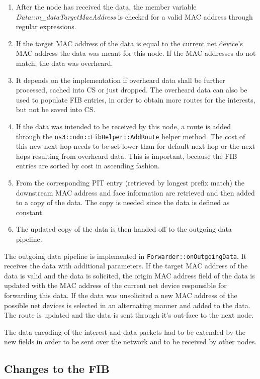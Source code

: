 \begin{enumerate}
\item After the node has received the data, the member variable  \emph{Data::m\_dataTargetMacAddress} is checked for a valid MAC address through regular expressions.
\item If the target MAC address of the data is equal to the current net device's MAC address the data was meant for this node. If the MAC addresses do not match, the data was overheard.
\item It depends on the implementation if overheard data shall be further processed, cached into CS or just dropped. The overheard data can also be used to populate FIB entries, in order to obtain more routes for the interests, but not be saved into CS.
\item If the data was intended to be received by this node, a route is added through the \texttt{ns3::ndn::FibHelper::AddRoute} helper method. The cost of this new next hop needs to be set lower than for default next hop or the next hops resulting from overheard data. This is important, because the FIB entries are sorted by cost in ascending fashion.
\item From the corresponding PIT entry (retrieved by longest prefix match) the downstream MAC address and face information are retrieved and then added to a copy of the data. The copy is needed since the data is defined as constant.
\item The updated copy of the data is then handed off to the outgoing data pipeline.
\end{enumerate}

The outgoing data pipeline is implemented in \texttt{Forwarder::onOutgoingData}. It receives the data with additional parameters. If the target MAC address of the data is valid and the data is solicited, the origin MAC address field of the data is updated with the MAC address of the current net device responsible for forwarding this data. If the data was unsolicited a new MAC address of the possible net devices is selected in an alternating manner and added to the data. The route is updated and the data is sent through it's out-face to the next node.

The data encoding of the interest and data packets had to be extended by the new fields in order to be sent over the network and to be received by other nodes.

\subsection{Changes to the FIB}

